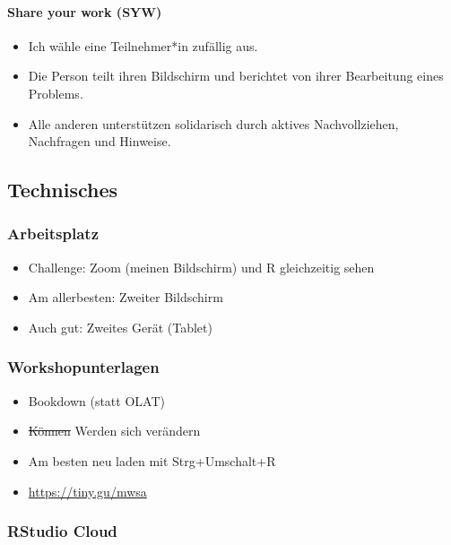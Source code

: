 \documentclass[11pt,german,a4paper]{article}
\providecommand{\tightlist}{%
  \setlength{\itemsep}{0pt}\setlength{\parskip}{0pt}}
\let\oldparagraph\paragraph
\renewcommand{\paragraph}[1]{\oldparagraph{#1}\mbox{}}
\begin{document}
\hypertarget{share-your-work-syw}{%
\paragraph{Share your work (SYW)}\label{share-your-work-syw}}

\begin{itemize}
\tightlist
\item
  Ich wähle eine Teilnehmer*in zufällig aus.
\item
  Die Person teilt ihren Bildschirm und berichtet von ihrer Bearbeitung eines Problems.
\item
  Alle anderen unterstützen solidarisch durch aktives Nachvollziehen, Nachfragen und Hinweise.
\end{itemize}

\hypertarget{technisches}{%
\subsection{Technisches}\label{technisches}}

\hypertarget{arbeitsplatz}{%
\subsubsection{Arbeitsplatz}\label{arbeitsplatz}}

\begin{itemize}
\tightlist
\item
  Challenge: Zoom (meinen Bildschirm) und R gleichzeitig sehen
\item
  Am allerbesten: Zweiter Bildschirm
\item
  Auch gut: Zweites Gerät (Tablet)
\end{itemize}

\hypertarget{workshopunterlagen}{%
\subsubsection{Workshopunterlagen}\label{workshopunterlagen}}

\begin{itemize}
\tightlist
\item
  Bookdown (statt OLAT)
\item
  \sout{Können} Werden sich verändern
\item
  Am besten neu laden mit Strg+Umschalt+R
\item
  \url{https://tiny.gu/mwsa}
\end{itemize}

\hypertarget{rstudio-cloud}{%
\subsubsection{RStudio Cloud}\label{rstudio-cloud}}
\end{document}
